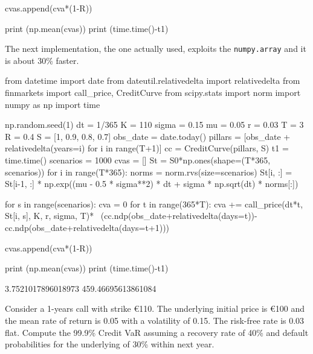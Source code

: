 \begin{solution}
\begin{ipython}
        cvas.append(cva*(1-R))

print (np.mean(cvas))
print (time.time()-t1)
\end{ipython}
The next implementation, the one actually used, exploits the \texttt{numpy.array} and it is about 30\% faster.

\begin{ipython}
from datetime import date
from dateutil.relativedelta import relativedelta
from finmarkets import call_price, CreditCurve
from scipy.stats import norm
import numpy as np
import time

np.random.seed(1)
dt = 1/365
K = 110
sigma = 0.15
mu = 0.05
r = 0.03
T = 3
R = 0.4
S = [1, 0.9, 0.8, 0.7]
obs_date = date.today()
pillars = [obs_date + relativedelta(years=i) for i in range(T+1)]
cc = CreditCurve(pillars, S)
t1 = time.time()
scenarios = 1000
cvas = []
St = S0*np.ones(shape=(T*365, scenarios))
for i in range(T*365):
    norms = norm.rvs(size=scenarios)
    St[i, :] = St[i-1, :] * np.exp((mu - 0.5 * sigma**2) * dt + sigma
        * np.sqrt(dt) * norms[:])

for s in range(scenarios):
    cva = 0
    for t in range(365*T):
        cva += call_price(dt*t, St[i, s], K, r, sigma, T)* \
            (cc.ndp(obs_date+relativedelta(days=t))-
             cc.ndp(obs_date+relativedelta(days=t+1)))

        cvas.append(cva*(1-R))

print (np.mean(cvas))
print (time.time()-t1)

3.7521017896018973
459.46695613861084
\end{ipython}
\end{solution}

\begin{question}
Consider a 1-years call with strike \euro{110}. The underlying initial price is \euro{100} and the mean rate of return is 0.05 with a volatility of 0.15. The risk-free rate is 0.03 flat.
Compute the 99.9\% Credit VaR assuming a recovery rate of 40\% and default probabilities for the underlying of 30\% within next year.
\end{question}

